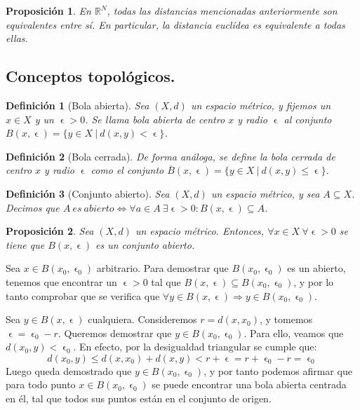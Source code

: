 \documentclass[11pt, a4paper, titlepage]{article}
\makeatletter
\let\epsilon\upvarepsilon
\renewenvironment{proof}[1][\proofname] {\vspace{-15pt}\par\pushQED{\qed}\normalfont\topsep6\p@\@plus6\p@\relax\trivlist\item[\hskip\labelsep\it#1\@addpunct{.}]\ignorespaces}{\popQED\endtrivlist\@endpefalse}
\theoremstyle{theorem-style}
\newtheorem*{nprop}{Proposición}
\theoremstyle{definition-style}
\newtheorem*{ndef}{Definición}
\theoremstyle{remark-style}
\theoremstyle{example-style}
\makeatother
\begin{document}
\begin{nprop}
En $\mathbb{R}^N$, todas las distancias mencionadas anteriormente son equivalentes entre sí. En particular, la distancia euclídea es equivalente a todas ellas.
\end{nprop}


\subsection{Conceptos topológicos.} 

\begin{ndef}[Bola abierta]
Sea $(X,d)$ un espacio métrico, y fijemos un $x\in X$ y un $\epsilon > 0$. Se llama \emph{bola abierta de centro $x$ y radio $\epsilon$} al conjunto $B(x,\epsilon) = \{ y\in X \ | \ d(x,y)<\epsilon\}$.
\end{ndef}



\begin{ndef}[Bola cerrada]
De forma análoga, se define la \emph{bola cerrada de centro $x$ y radio $\epsilon$} como el conjunto $\overline{B}(x,\epsilon) = \{y\in X \ | \ d(x,y)\leq \epsilon \}$.
\end{ndef}



\begin{ndef}[Conjunto abierto]
Sea $(X,d)$ un espacio métrico, y sea $A\subseteq X$. Decimos que \mbox{$A\ es\ abierto \iff \forall a \in A\ \exists \epsilon > 0: B(x,\epsilon) \subseteq A$}.	
\end{ndef}



\begin{nprop}
Sea $(X,d)$ un espacio métrico. Entonces, $\forall x \in X \ \forall \epsilon > 0$ se tiene que $B(x,\epsilon)$ es un conjunto abierto.
\end{nprop}

\begin{proof}

Sea $x \in B(x_0,\epsilon_0) $ arbitrario. Para demostrar que $B(x_0,\epsilon_0)$ es un abierto, tenemos que encontrar un $\epsilon > 0$ tal que $B(x,\epsilon) \subseteq B(x_0,\epsilon_0)  $, y por lo tanto comprobar que se verifica que $\forall y \in B(x,\epsilon) \Rightarrow y \in B(x_0,\epsilon_0).$

Sea $y \in B(x, \epsilon )$ cualquiera. Consideremos $r = d(x, x_0)$, y tomemos $\epsilon = \epsilon_0 - r$. Queremos demostrar que $y \in B(x_0, \epsilon_0)$. Para ello, veamos que $d(x_0, y) < \epsilon_0$. En efecto, por la desigualdad triangular se cumple que: $$d(x_0, y) \leq d(x,x_0) + d(x,y) < r + \epsilon = r + \epsilon_0 - r = \epsilon_0 $$
Luego queda demostrado que $y \in B(x_0, \epsilon_0)$, y por tanto podemos afirmar que para todo punto $x \in B(x_0, \epsilon_0)$ se puede encontrar una bola abierta centrada en él, tal que todos sus puntos están en el conjunto de origen.
\end{proof}
\end{document}
